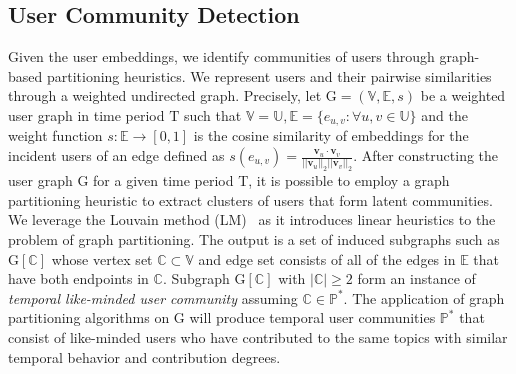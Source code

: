 \documentclass[sigconf]{acmart}
\begin{document}
\subsection{User Community Detection\label{community_detection}}
Given the user embeddings, we identify communities of users through graph-based partitioning heuristics. We represent users and their pairwise similarities through a weighted undirected graph. Precisely, let $\text{G}=(\mathbb{V},\mathbb{E}, s)$ be a weighted user graph in time period $\text{T}$ such that $\mathbb{V}=\mathbb{U},\mathbb{E}=\{e_{u,v}:\forall{u,v}\in\mathbb{U}\}$ and the weight function $s:\mathbb{E}\rightarrow[0,1]$ is the cosine similarity of embeddings for the incident users of an edge defined as $s(e_{u,v})=\frac{\textbf{v}_u\cdot{\textbf{v}_v}}{||\textbf{v}_u||_2||\textbf{v}_v||_2}$. After constructing the user graph G for a given time period T, it is possible to employ a graph partitioning heuristic to extract clusters of users that form latent communities. We leverage the Louvain method (LM)~\cite{1742-5468-2008-10-P10008} as it introduces linear heuristics to the problem of graph partitioning. The output is a set of induced subgraphs such as $\text{G}[\mathbb{C}]$ whose vertex set $\mathbb{C}\subset{\mathbb{V}}$ and edge set consists of all of the edges in $\mathbb{E}$ that have both endpoints in $\mathbb{C}$. Subgraph $\text{G}[\mathbb{C}]$ with $|\mathbb{C}|\geq2$ form an instance of \textit{temporal like-minded user community} assuming $\mathbb{C}\in\mathbb{P}^*$. The application of graph partitioning algorithms on G will produce temporal user communities $\mathbb{P}^*$ that consist of like-minded users who have contributed to the same topics with similar temporal behavior and contribution degrees.


 
\end{document}
